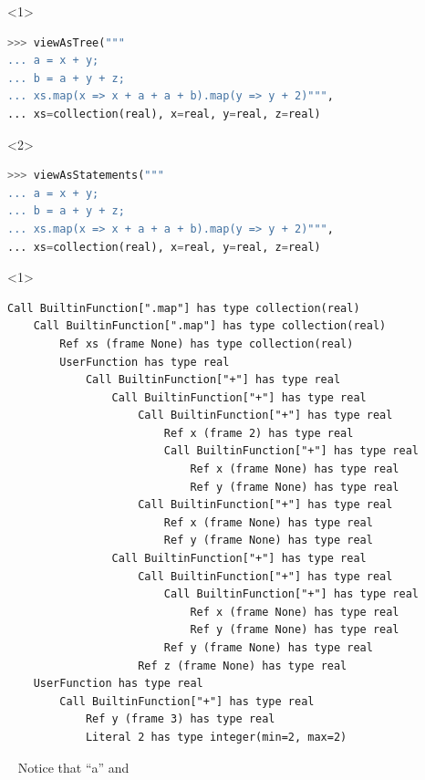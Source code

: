 \documentclass{beamer}
\begin{document}
\begin{frame}[fragile]{}
\begin{onlyenv}<1>
\begin{lstlisting}[language=python]
>>> viewAsTree("""
... a = x + y;
... b = a + y + z;
... xs.map(x => x + a + a + b).map(y => y + 2)""",
... xs=collection(real), x=real, y=real, z=real)
\end{lstlisting}
\end{onlyenv}
\begin{onlyenv}<2>
\begin{lstlisting}[language=python]
>>> viewAsStatements("""
... a = x + y;
... b = a + y + z;
... xs.map(x => x + a + a + b).map(y => y + 2)""",
... xs=collection(real), x=real, y=real, z=real)
\end{lstlisting}
\end{onlyenv}

\vspace{-0.5 cm}
\begin{minipage}[t][12cm][t]{\textwidth}
\begin{onlyenv}<1>
\begin{lstlisting}[basicstyle=\ttfamily\tiny]
Call BuiltinFunction[".map"] has type collection(real)
    Call BuiltinFunction[".map"] has type collection(real)
        Ref xs (frame None) has type collection(real)
        UserFunction has type real
            Call BuiltinFunction["+"] has type real
                Call BuiltinFunction["+"] has type real
                    Call BuiltinFunction["+"] has type real
                        Ref x (frame 2) has type real
                        Call BuiltinFunction["+"] has type real
                            Ref x (frame None) has type real
                            Ref y (frame None) has type real
                    Call BuiltinFunction["+"] has type real
                        Ref x (frame None) has type real
                        Ref y (frame None) has type real
                Call BuiltinFunction["+"] has type real
                    Call BuiltinFunction["+"] has type real
                        Call BuiltinFunction["+"] has type real
                            Ref x (frame None) has type real
                            Ref y (frame None) has type real
                        Ref y (frame None) has type real
                    Ref z (frame None) has type real
    UserFunction has type real
        Call BuiltinFunction["+"] has type real
            Ref y (frame 3) has type real
            Literal 2 has type integer(min=2, max=2)
\end{lstlisting}
\vspace{-6 cm}
\mbox{ } \hfill Notice that ``a'' and


\end{onlyenv}
\end{minipage}
\end{frame}
\end{document}
